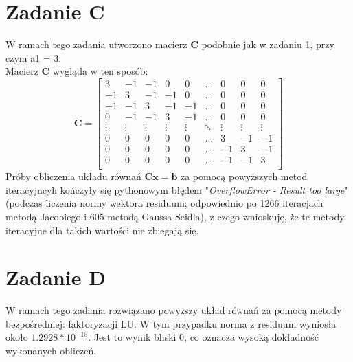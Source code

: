 \documentclass{article} %
\begin{document}
\section{Zadanie C}
W ramach tego zadania utworzono macierz \textbf{C} podobnie jak w zadaniu 1, przy czym a1 = 3. \\
Macierz \textbf{C} wygląda w ten sposób: \\
\[
\textbf{C} = 
\begin{bmatrix}
    3 & -1 & -1 & 0 & 0 &\dots & 0 & 0 & 0 \\
    -1 & 3 & -1 & -1 & 0 & \dots & 0 & 0 & 0\\
    -1 & -1 & 3 & -1 & -1 & \dots & 0 & 0 & 0 \\
    0 & -1 & -1 & 3 & -1 & \dots & 0 & 0 & 0 \\
    \vdots & \vdots & \vdots & \vdots & \vdots & \ddots & \vdots & \vdots & \vdots \\
    0 & 0 & 0 & 0 & 0 & \dots & 3 & -1 & -1 \\
    0 & 0 & 0 & 0 & 0 & \dots & -1 & 3 & -1 \\
    0 & 0 & 0 & 0 & 0 & \dots & -1 & -1 & 3 \\
\end{bmatrix}
\]
Próby obliczenia układu równań \(\mathbf{Cx}=\mathbf{b}\) 
za pomocą powyższych metod iteracyjncyh kończyły się pythonowym błędem "\textit{OverflowError - Result too large}" 
(podczas liczenia normy wektora residuum; odpowiednio po 1266 iteracjach metodą Jacobiego i 605 metodą Gaussa-Seidla),
z czego wnioskuję, że te metody iteracyjne dla takich wartości nie zbiegają się.
\section{Zadanie D}
W ramach tego zadania rozwiązano powyższy układ równań za pomocą
 metody bezpośredniej: faktoryzacji LU. 
W tym przypadku norma z residuum wyniosła około \(1.2928*10^{-15}\).
Jest to wynik bliski 0, co oznacza wysoką dokładność wykonanych obliczeń.
 \newpage
\end{document}
